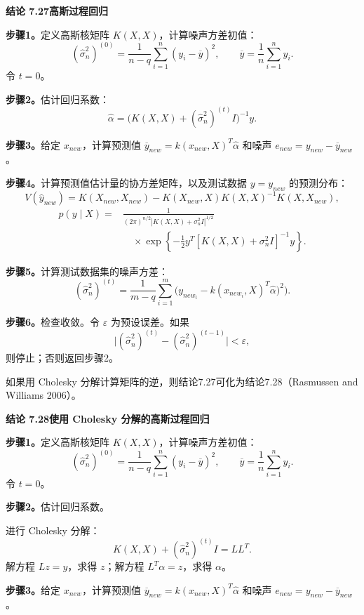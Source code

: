 \noindent\textbf{结论 7.27\quad 高斯过程回归}

\noindent\textbf{步骤1。}定义高斯核矩阵 $K(X,X)$，计算噪声方差初值：
\[
(\widehat\sigma_n^2)^{(0)}=\frac1{n-q}\sum_{i=1}^{n}(y_i-\overline y)^2,
\qquad \overline y=\frac1n\sum_{i=1}^{n}y_i.
\]
令 $t=0$。

\noindent\textbf{步骤2。}估计回归系数：
\[
\widehat\alpha=\bigl(K(X,X)+(\widehat\sigma_n^2)^{(t)}I\bigr)^{-1}y.
\]

\noindent\textbf{步骤3。}给定 $x_{new}$，计算预测值 $\overline y_{new}=k(x_{new},X)^T\widehat\alpha$ 和噪声 $e_{new}=y_{new}-\overline y_{new}$。

\noindent\textbf{步骤4。}计算预测值估计量的协方差矩阵，以及测试数据 $y=y_{new}$ 的预测分布：
\[
V(\widehat y_{new})=K(X_{new},X_{new})-K(X_{new},X)K(X,X)^{-1}K(X,X_{new}),
\]
\[
\begin{aligned}
p(y\mid X)={}&\frac1{(2\pi)^{n/2}|K(X,X)+\sigma_n^2I|^{1/2}}\\
&\quad\times\exp\left\{-\frac12y^T[K(X,X)+\sigma_n^2I]^{-1}y\right\}.
\end{aligned}
\]

\noindent\textbf{步骤5。}计算测试数据集的噪声方差：
\[
(\widehat\sigma_n^2)^{(t)}=\frac1{m-q}\sum_{i=1}^{m}
\bigl(y_{new_i}-k(x_{new_i},X)^T\widehat\alpha)^2\bigr).
\]

\noindent\textbf{步骤6。}检查收敛。令 $\varepsilon$ 为预设误差。如果
\[
\bigl|(\widehat\sigma_n^2)^{(t)}-(\widehat\sigma_n^2)^{(t-1)}\bigr|<\varepsilon,
\]
则停止；否则返回步骤2。

如果用 Cholesky 分解计算矩阵的逆，则结论7.27可化为结论7.28（Rasmussen and Williams 2006）。

\noindent\textbf{结论 7.28\quad 使用 Cholesky 分解的高斯过程回归}

\noindent\textbf{步骤1。}定义高斯核矩阵 $K(X,X)$，计算噪声方差初值：
\[
(\widehat\sigma_n^2)^{(0)}=\frac1{n-q}\sum_{i=1}^{n}(y_i-\overline y)^2,
\qquad \overline y=\frac1n\sum_{i=1}^{n}y_i.
\]
令 $t=0$。

\noindent\textbf{步骤2。}估计回归系数。

进行 Cholesky 分解：
\[
K(X,X)+(\widehat\sigma_n^2)^{(t)}I=LL^T.
\]
解方程 $Lz=y$，求得 $z$；解方程 $L^T\alpha=z$，求得 $\alpha$。

\noindent\textbf{步骤3。}给定 $x_{new}$，计算预测值 $\overline y_{new}=k(x_{new},X)^T\widehat\alpha$ 和噪声 $e_{new}=y_{new}-\overline y_{new}$。


